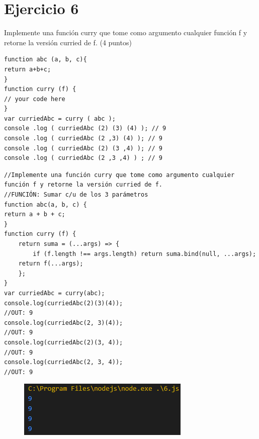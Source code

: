 \documentclass{article}
\begin{document}
\newpage
\section{Ejercicio 6}
Implemente una función curry que tome como argumento cualquier función f y retorne la versión curried de f. (4 puntos)

\begin{verbatim}
function abc (a, b, c){
return a+b+c;
}
function curry (f) {
// your code here
}
var curriedAbc = curry ( abc );
console .log ( curriedAbc (2) (3) (4) ); // 9
console .log ( curriedAbc (2 ,3) (4) ); // 9
console .log ( curriedAbc (2) (3 ,4) ); // 9
console .log ( curriedAbc (2 ,3 ,4) ) ; // 9
\end{verbatim}

\begin{verbatim}
//Implemente una función curry que tome como argumento cualquier función f y retorne la versión curried de f.
//FUNCIÓN: Sumar c/u de los 3 parámetros 
function abc(a, b, c) {
return a + b + c;
}
function curry (f) {
    return suma = (...args) => {
        if (f.length !== args.length) return suma.bind(null, ...args);
    return f(...args);
    };
}
var curriedAbc = curry(abc);
console.log(curriedAbc(2)(3)(4));
//OUT: 9
console.log(curriedAbc(2, 3)(4));
//OUT: 9 
console.log(curriedAbc(2)(3, 4));
//OUT: 9
console.log(curriedAbc(2, 3, 4));
//OUT: 9
\end{verbatim}
\begin{figure}[h]
\centering
\includegraphics[scale=1.5]{EJERCICIO6.png}
\end{figure}
\end{document}
